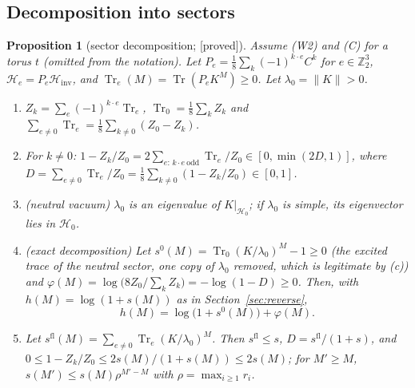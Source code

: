 \documentclass[11pt,a4paper]{article}
\theoremstyle{plain}
\newtheorem{proposition}[theorem]{Proposition}
\theoremstyle{definition}
\theoremstyle{remark}
\numberwithin{equation}{section}
\newcommand{\Z}{\mathbb{Z}}
\newcommand{\Tr}{\operatorname{Tr}}
\newcommand{\Hinv}{\mathcal{H}_{\mathrm{inv}}}
\newcommand{\st}[1]{\textsf{[#1]}}
\begin{document}
\subsection{Decomposition into sectors}\label{subsec:T1}
\begin{proposition}[sector decomposition; \st{proved}]\label{prop:sectors}
Assume (W2) and (C) for a torus $t$ (omitted from the notation). Let $P_e=\frac18\sum_k(-1)^{k\cdot e}C^k$ for $e\in\Z_2^3$, $\mathcal H_e=P_e\Hinv$, and $\Tr_e(M)=\Tr(P_eK^M)\ge0$. Let $\lambda_0=\|K\|>0$.
\begin{enumerate}
\item[(a)] $Z_k=\sum_e(-1)^{k\cdot e}\Tr_e$, $\Tr_0=\frac18\sum_kZ_k$ and $\sum_{e\ne0}\Tr_e=\frac18\sum_{k\ne0}(Z_0-Z_k)$.
\item[(b)] For $k\ne0$: $1-Z_k/Z_0=2\sum_{e:\,k\cdot e\ \mathrm{odd}}\Tr_e/Z_0\in[0,\min(2D,1)]$, where $D=\sum_{e\ne0}\Tr_e/Z_0=\frac18\sum_{k\ne0}(1-Z_k/Z_0)\in[0,1]$.
\item[(c)] (neutral vacuum) $\lambda_0$ is an eigenvalue of $K|_{\mathcal H_0}$; if $\lambda_0$ is simple, its eigenvector lies in $\mathcal H_0$.
\item[(d)] (exact decomposition) Let $s^0(M)=\Tr_0(K/\lambda_0)^M-1\ge0$ (the excited trace of the neutral sector, one copy of $\lambda_0$ removed, which is legitimate by (c)) and $\varphi(M)=\log\bigl(8Z_0/\sum_kZ_k\bigr)=-\log(1-D)\ge0$. Then, with $h(M)=\log(1+s(M))$ as in Section~\ref{sec:reverse},
\[
h(M)=\log\bigl(1+s^0(M)\bigr)+\varphi(M).
\]
\item[(e)] Let $s^{\mathrm{fl}}(M)=\sum_{e\ne0}\Tr_e(K/\lambda_0)^M$. Then $s^{\mathrm{fl}}\le s$, $D=s^{\mathrm{fl}}/(1+s)$, and $0\le1-Z_k/Z_0\le2s(M)/(1+s(M))\le2s(M)$; for $M'\ge M$, $s(M')\le s(M)\rho^{M'-M}$ with $\rho=\max_{i\ge1}r_i$.
\end{enumerate}
\end{proposition}
\end{document}
